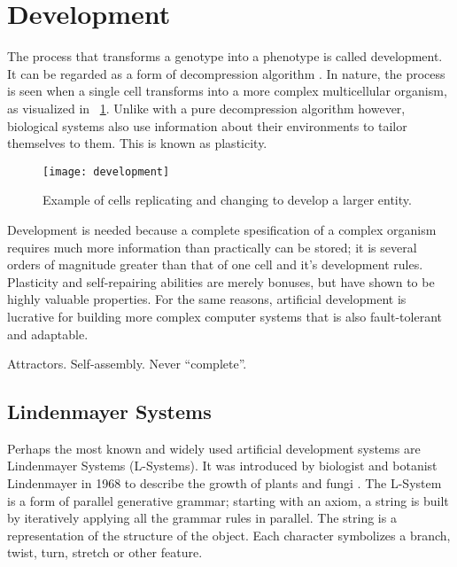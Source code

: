 
\section{Development}

The process that transforms a genotype into a phenotype is called development.
It can be regarded as a form of decompression algorithm \cite{harding2008artificial}.
In nature, the process is seen when a single cell transforms into a more complex multicellular organism, as visualized in \figurename~\ref{fig:development}.
Unlike with a pure decompression algorithm however, biological systems also use information about their environments to tailor themselves to them.
This is known as plasticity.

\begin{figure}[!ht]
    \centering
    \texttt{[image: development]}
    \caption[Development]{
        Example of cells replicating and changing to develop a larger entity.
    }
    \label{fig:development}
\end{figure}

Development is needed because a complete spesification of a complex organism requires much more information than practically can be stored; it is several orders of magnitude greater than that of one cell and it's development rules.
Plasticity and self-repairing abilities are merely bonuses, but have shown to be highly valuable properties.
For the same reasons, artificial development is lucrative for building more complex computer systems that is also fault-tolerant and adaptable.

\TODO
Attractors.
Self-assembly.
Never ``complete''.

\subsection{Lindenmayer Systems}

Perhaps the most known and widely used artificial development systems are Lindenmayer Systems (L-Systems).
It was introduced by biologist and botanist Lindenmayer in 1968 to describe the growth of plants and fungi \cite{lindenmayer1968models}.
The L-System is a form of parallel generative grammar; starting with an axiom, a string is built by iteratively applying all the grammar rules in parallel.
The string is a representation of the structure of the object.
Each character symbolizes a branch, twist, turn, stretch or other feature.

